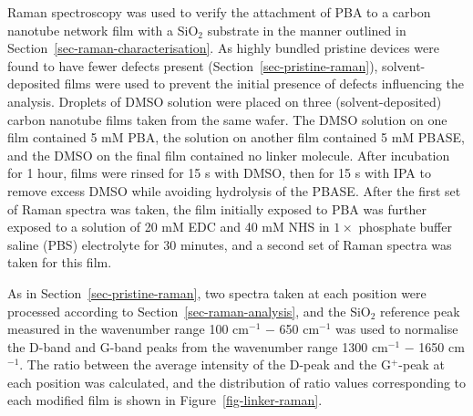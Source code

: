 \documentclass[
  a4paper,
]{scrbook}
\begin{document}
Raman spectroscopy was used to verify the attachment of PBA to a carbon
nanotube network film with a SiO\(_2\) substrate in the manner outlined
in Section~\ref{sec-raman-characterisation}. As highly bundled pristine
devices were found to have fewer defects present
(Section~\ref{sec-pristine-raman}), solvent-deposited films were used to
prevent the initial presence of defects influencing the analysis.
Droplets of DMSO solution were placed on three (solvent-deposited)
carbon nanotube films taken from the same wafer. The DMSO solution on
one film contained 5 mM PBA, the solution on another film contained 5 mM
PBASE, and the DMSO on the final film contained no linker molecule.
After incubation for 1 hour, films were rinsed for 15 s with DMSO, then
for 15 s with IPA to remove excess DMSO while avoiding hydrolysis of the
PBASE. After the first set of Raman spectra was taken, the film
initially exposed to PBA was further exposed to a solution of 20 mM EDC
and 40 mM NHS in \(1 \times\) phosphate buffer saline (PBS) electrolyte
for 30 minutes, and a second set of Raman spectra was taken for this
film.

As in Section~\ref{sec-pristine-raman}, two spectra taken at each
position were processed according to Section~\ref{sec-raman-analysis},
and the SiO\(_2\) reference peak measured in the wavenumber range 100
cm\(^{-1}\) \(-\) 650 cm\(^{-1}\) was used to normalise the D-band and
G-band peaks from the wavenumber range 1300 cm\(^{-1}\) \(-\) 1650
cm\(^{-1}\). The ratio between the average intensity of the D-peak and
the G\(^+\)-peak at each position was calculated, and the distribution
of ratio values corresponding to each modified film is shown in
Figure~\ref{fig-linker-raman}.
\end{document}
